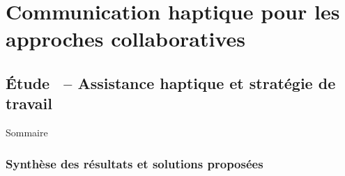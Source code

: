 \documentclass[english,french,dvips,10pt]{mybeamer}
\begin{document}
	\section{Communication haptique pour les approches collaboratives}
	\subsection{Étude~ -- Assistance haptique et stratégie de travail}
	\begin{myframe}{Sommaire}
		\tableofcontents[sectionstyle=show/shaded,subsectionstyle=show/shaded/hide,subsubsectionstyle=show/show/hide]
	\end{myframe}
	\subsubsection{Synthèse des résultats et solutions proposées}
\end{document}
